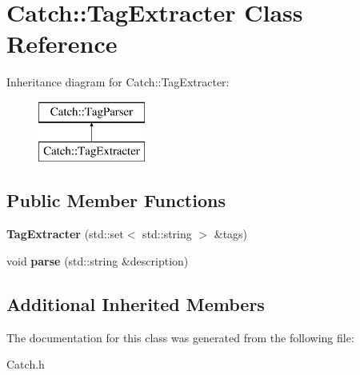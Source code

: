\hypertarget{class_catch_1_1_tag_extracter}{\section{Catch\-:\-:Tag\-Extracter Class Reference}
\label{class_catch_1_1_tag_extracter}
}
Inheritance diagram for Catch\-:\-:Tag\-Extracter\-:\begin{figure}[H]
\begin{center}
\leavevmode
\includegraphics[height=2.000000cm]{class_catch_1_1_tag_extracter}
\end{center}
\end{figure}
\subsection*{Public Member Functions}
\begin{DoxyCompactItemize}
\item 
\hypertarget{class_catch_1_1_tag_extracter_a146d1ab5e247d5ec7c2c61a8c59b7950}{{\bfseries Tag\-Extracter} (std\-::set$<$ std\-::string $>$ \&tags)}\label{class_catch_1_1_tag_extracter_a146d1ab5e247d5ec7c2c61a8c59b7950}

\item 
\hypertarget{class_catch_1_1_tag_extracter_a2f9446590db696802be81b0f743bf9f6}{void {\bfseries parse} (std\-::string \&description)}\label{class_catch_1_1_tag_extracter_a2f9446590db696802be81b0f743bf9f6}

\end{DoxyCompactItemize}
\subsection*{Additional Inherited Members}


The documentation for this class was generated from the following file\-:\begin{DoxyCompactItemize}
\item 
Catch.\-h\end{DoxyCompactItemize}
